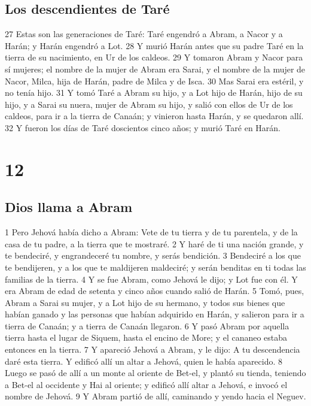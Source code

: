 \section{Los descendientes de Taré}

27 Estas son las generaciones de Taré: Taré engendró a Abram, a Nacor y a Harán; y Harán engendró a Lot.
28 Y murió Harán antes que su padre Taré en la tierra de su nacimiento, en Ur de los caldeos.
29 Y tomaron Abram y Nacor para sí mujeres; el nombre de la mujer de Abram era Sarai, y el nombre de la mujer de Nacor, Milca, hija de Harán, padre de Milca y de Isca.
30 Mas Sarai era estéril, y no tenía hijo.
31 Y tomó Taré a Abram su hijo, y a Lot hijo de Harán, hijo de su hijo, y a Sarai su nuera, mujer de Abram su hijo, y salió con ellos de Ur de los caldeos, para ir a la tierra de Canaán; y vinieron hasta Harán, y se quedaron allí.
32 Y fueron los días de Taré doscientos cinco años; y murió Taré en Harán.

\chapter{12}

\section{Dios llama a Abram}

1 Pero Jehová había dicho a Abram: Vete de tu tierra y de tu parentela, y de la casa de tu padre, a la tierra que te mostraré.
2 Y haré de ti una nación grande, y te bendeciré, y engrandeceré tu nombre, y serás bendición.
3 Bendeciré a los que te bendijeren, y a los que te maldijeren maldeciré; y serán benditas en ti todas las familias de la tierra.
4 Y se fue Abram, como Jehová le dijo; y Lot fue con él. Y era Abram de edad de setenta y cinco años cuando salió de Harán.
5 Tomó, pues, Abram a Sarai su mujer, y a Lot hijo de su hermano, y todos sus bienes que habían ganado y las personas que habían adquirido en Harán, y salieron para ir a tierra de Canaán; y a tierra de Canaán llegaron.
6 Y pasó Abram por aquella tierra hasta el lugar de Siquem, hasta el encino de More; y el cananeo estaba entonces en la tierra.
7 Y apareció Jehová a Abram, y le dijo: A tu descendencia daré esta tierra. Y edificó allí un altar a Jehová, quien le había aparecido.
8 Luego se pasó de allí a un monte al oriente de Bet-el, y plantó su tienda, teniendo a Bet-el al occidente y Hai al oriente; y edificó allí altar a Jehová, e invocó el nombre de Jehová.
9 Y Abram partió de allí, caminando y yendo hacia el Neguev.

